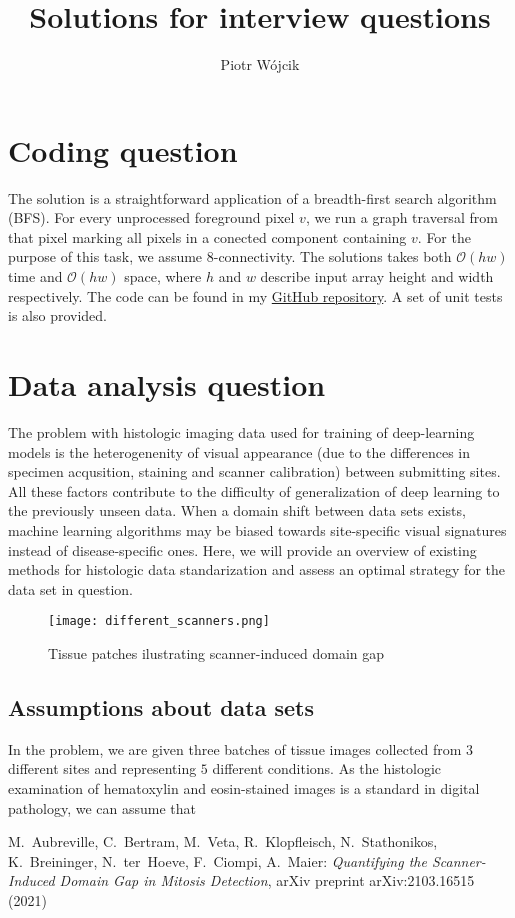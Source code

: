 \documentclass[11pt]{article}
\title{Solutions for interview questions}
\author{Piotr Wójcik}
\begin{document}
\maketitle
\section{Coding question}
The solution is a straightforward application of a breadth-first search algorithm (BFS). For every unprocessed foreground pixel $v$, 
we run a graph traversal from that pixel marking all pixels in a conected component containing $v$. For the purpose of this task, we assume $8$-connectivity.
The solutions takes both $\mathcal{O}(hw)$ time and $\mathcal{O}(hw)$ space, where $h$ and $w$ describe input array height and width respectively. 
The code can be found in my \href{https://github.com/piotrmwojcik/interview_questions}{GitHub repository}. A set of unit tests is also provided.
\section{Data analysis question}
The problem with histologic imaging data used for training of deep-learning models is the heterogenenity of visual appearance (due to the differences in specimen acqusition, staining and scanner calibration) between submitting sites. 
All these factors contribute to the difficulty of generalization of deep learning to the previously unseen data. When a domain shift between data sets exists, machine learning algorithms may be biased towards site-specific visual signatures instead of disease-specific ones. 
Here, we will provide an overview of existing methods for histologic data standarization and assess an optimal strategy for the data set in question.
\begin{figure}
\centering
\texttt{[image: different\_scanners.png]}
\caption{Tissue patches ilustrating scanner-induced domain gap}
\end{figure}
\subsection{Assumptions about data sets}
In the problem, we are given three batches of tissue images collected from $3$ different sites and representing $5$ different conditions.
As the histologic examination of hematoxylin and eosin-stained images is a standard in digital pathology, we can assume that 
\begin{thebibliography}{99}
 M.~Aubreville, C.~Bertram, M.~Veta, R.~Klopfleisch, N.~Stathonikos, K.~Breininger, N.~ter~Hoeve, F.~Ciompi, A.~Maier:
 \emph{Quantifying the Scanner-Induced Domain Gap in Mitosis Detection},
arXiv preprint arXiv:2103.16515 (2021)
\end{thebibliography}
\end{document}
